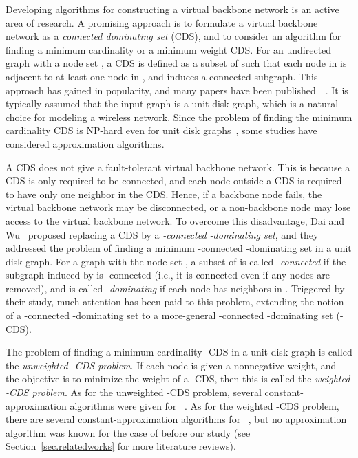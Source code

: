 \documentclass[11pt]{article}
\begin{document}
Developing algorithms for constructing a virtual backbone network
is an active area of research.
A promising approach
is to formulate
a virtual backbone network 
as a \emph{connected dominating set} (CDS), and
to consider an algorithm for finding a minimum cardinality or a minimum
weight CDS.
For an undirected graph with a node set , a CDS
is defined as a subset  of  such that
each node in  is adjacent to at least one node in ,
and  induces a connected subgraph.
This approach has gained in popularity,
and many papers have been published~~\cite{AmbuhlEMN06,ChengHLWD03,GuhaK98,GuhaK99,MaratheBHRR95,ZouLGW09}.
It is typically assumed that the input graph is a unit disk graph,
which is a natural choice for modeling a wireless network.
Since the problem of finding the minimum
cardinality CDS
is NP-hard even for unit disk graphs~\cite{ClarkCJ90},
some studies have considered approximation algorithms.


A CDS does not give a fault-tolerant virtual backbone network.
This is because a CDS is only required to be connected,
and each node outside a CDS is required to have only one neighbor in the CDS.
Hence, if a backbone node fails,
the virtual backbone network may be disconnected,
or a non-backbone node may lose access to the virtual backbone network.
To overcome this disadvantage, 
Dai and
Wu~\cite{Dai:2006}
proposed replacing a CDS by a \emph{-connected -dominating set},
and they addressed the problem of finding a minimum -connected
-dominating set in a unit disk graph.
For a graph with the node set ,
a subset  of 
is called \emph{-connected} if the subgraph induced by 
is -connected (i.e., it is connected even if any  nodes are
removed),
and is called \emph{-dominating} if each node  has 
neighbors in .
Triggered by their study, 
much attention has been paid to this problem,
extending the notion of 
a -connected -dominating set to a more-general -connected -dominating
set (-CDS).

The problem of finding a minimum cardinality -CDS in a unit disk
graph is called the \emph{unweighted -CDS problem}.
If each node is given
a nonnegative weight, and
the objective is to minimize the weight of a -CDS,
then this is called the \emph{weighted -CDS problem}.
As for the unweighted -CDS problem,
several 
constant-approximation algorithms were given
for ~\cite{Shang:2007jg,ShiZZW16,WangKAGLZW13,Wang:2015,Zhang16}.
As for the weighted -CDS problem,
there are several constant-approximation algorithms for ~\cite{AmbuhlEMN06,ZouLGW09},
but no approximation algorithm was known for
the case of  before our study
(see Section~\ref{sec.relatedworks} for more literature reviews).
\end{document}
